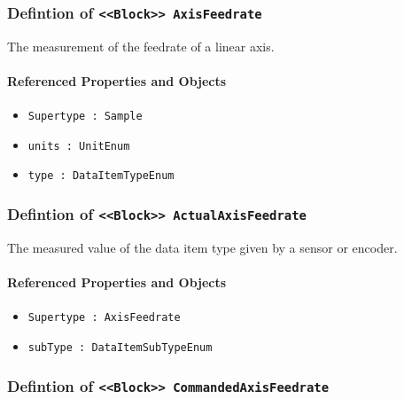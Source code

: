 \subsubsection{Defintion of \texttt{<<Block>> AxisFeedrate}}
  \label{type:AxisFeedrate}

\FloatBarrier

The measurement of the feedrate of a linear axis.

\FloatBarrier
\paragraph{Referenced Properties and Objects}

\begin{itemize}
\item \texttt{Supertype : Sample}

\item \texttt{units : UnitEnum}

\item \texttt{type : DataItemTypeEnum}

\end{itemize}
\FloatBarrier
\subsubsection{Defintion of \texttt{<<Block>> ActualAxisFeedrate}}
  \label{type:ActualAxisFeedrate}

\FloatBarrier

The measured value of the data item type given by a sensor or encoder.

\FloatBarrier
\paragraph{Referenced Properties and Objects}

\begin{itemize}
\item \texttt{Supertype : AxisFeedrate}

\item \texttt{subType : DataItemSubTypeEnum}

\end{itemize}
\FloatBarrier
\subsubsection{Defintion of \texttt{<<Block>> CommandedAxisFeedrate}}
  \label{type:CommandedAxisFeedrate}

\FloatBarrier

